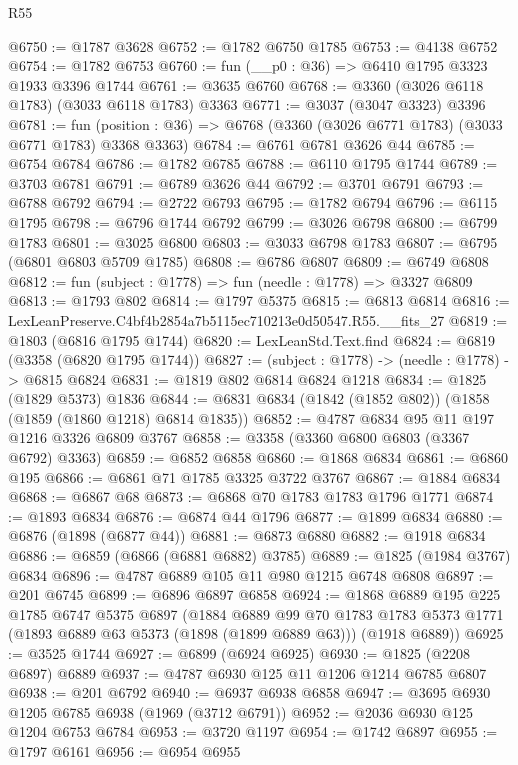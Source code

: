 \begin{lexlean}{R55}
\begin{coremodule}
@6750 := @1787 @3628
@6752 := @1782 @6750 @1785
@6753 := @4138 @6752
@6754 := @1782 @6753
@6760 := fun (__p0 : @36) => @6410 @1795 @3323 @1933 @3396 @1744
@6761 := @3635 @6760
@6768 := @3360 (@3026 @6118 @1783) (@3033 @6118 @1783) @3363
@6771 := @3037 (@3047 @3323) @3396
@6781 := fun (position : @36) => @6768 (@3360 (@3026 @6771 @1783) (@3033 @6771 @1783) @3368 @3363)
@6784 := @6761 @6781 @3626 @44
@6785 := @6754 @6784
@6786 := @1782 @6785
@6788 := @6110 @1795 @1744
@6789 := @3703 @6781
@6791 := @6789 @3626 @44
@6792 := @3701 @6791
@6793 := @6788 @6792
@6794 := @2722 @6793
@6795 := @1782 @6794
@6796 := @6115 @1795
@6798 := @6796 @1744 @6792
@6799 := @3026 @6798
@6800 := @6799 @1783
@6801 := @3025 @6800
@6803 := @3033 @6798 @1783
@6807 := @6795 (@6801 @6803 @5709 @1785)
@6808 := @6786 @6807
@6809 := @6749 @6808
@6812 := fun (subject : @1778) => fun (needle : @1778) => @3327 @6809
@6813 := @1793 @802
@6814 := @1797 @5375
@6815 := @6813 @6814
@6816 := LexLeanPreserve.C4bf4b2854a7b5115ec710213e0d50547.R55.__fits_27
@6819 := @1803 (@6816 @1795 @1744)
@6820 := LexLeanStd.Text.find
@6824 := @6819 (@3358 (@6820 @1795 @1744))
@6827 := (subject : @1778) -> (needle : @1778) -> @6815 @6824
@6831 := @1819 @802 @6814 @6824 @1218
@6834 := @1825 (@1829 @5373) @1836
@6844 := @6831 @6834 (@1842 (@1852 @802)) (@1858 (@1859 (@1860 @1218) @6814 @1835))
@6852 := @4787 @6834 @95 @11 @197 @1216 @3326 @6809 @3767
@6858 := @3358 (@3360 @6800 @6803 (@3367 @6792) @3363)
@6859 := @6852 @6858
@6860 := @1868 @6834
@6861 := @6860 @195
@6866 := @6861 @71 @1785 @3325 @3722 @3767
@6867 := @1884 @6834
@6868 := @6867 @68
@6873 := @6868 @70 @1783 @1783 @1796 @1771
@6874 := @1893 @6834
@6876 := @6874 @44 @1796
@6877 := @1899 @6834
@6880 := @6876 (@1898 (@6877 @44))
@6881 := @6873 @6880
@6882 := @1918 @6834
@6886 := @6859 (@6866 (@6881 @6882) @3785)
@6889 := @1825 (@1984 @3767) @6834
@6896 := @4787 @6889 @105 @11 @980 @1215 @6748 @6808
@6897 := @201 @6745
@6899 := @6896 @6897 @6858
@6924 := @1868
    @6889
    @195
    @225
    @1785
    @6747
    @5375
    @6897
    (@1884
      @6889
      @99
      @70
      @1783
      @1783
      @5373
      @1771
      (@1893 @6889 @63 @5373 (@1898 (@1899 @6889 @63)))
      (@1918 @6889))
@6925 := @3525 @1744
@6927 := @6899 (@6924 @6925)
@6930 := @1825 (@2208 @6897) @6889
@6937 := @4787 @6930 @125 @11 @1206 @1214 @6785 @6807
@6938 := @201 @6792
@6940 := @6937 @6938 @6858
@6947 := @3695 @6930 @1205 @6785 @6938 (@1969 (@3712 @6791))
@6952 := @2036 @6930 @125 @1204 @6753 @6784
@6953 := @3720 @1197
@6954 := @1742 @6897
@6955 := @1797 @6161
@6956 := @6954 @6955

\end{coremodule}
\end{lexlean}
